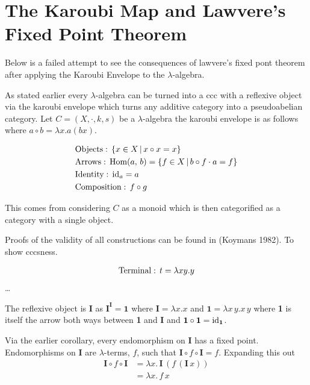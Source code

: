 \documentclass[ %
                author={Alessio Zakaria},
                supervisor={Dr. Nicolas Wu},
                degree={MEng},
                title={Automated Theorem Proving in Category Theory and the
                $\lambda$-calculus},
                subtitle={},
                type={Research},
                year={2019} ]{dissertation}
\begin{document}
\appendix

\chapter{The Karoubi Map and Lawvere's Fixed Point Theorem}
\label{appx:karoubi}

Below is a failed attempt to see the consequences of lawvere's fixed pont
theorem after applying the Karoubi Envelope to the $\lambda$-algebra.

As stated earlier every $\lambda$-algebra can be turned into a ccc with a
reflexive object via the karoubi envelope which turns any additive category into
a pseudoabelian category. Let $C = (X, \cdot , k, s)$ be a $\lambda$-algebra the
karoubi envelope is as follows where $a \circ b = \lambda x . a (b x)$.

\begin{align*}
    &\textnormal{Objects}: \, \{ x \in X \, | \, x \circ x = x \} \\
    &\textnormal{Arrows}: \, \textnormal{Hom}(a, \, b) =  \{ f \in X \, | \, b
        \circ f
    \cdot a = f\} \\
    &\textnormal{Identity}: \, \textnormal{id}_{a} = a \\
    &\textnormal{Composition}: \, f \circ g
\end{align*}

This comes from considering $C$ as a monoid which is then categorified as a
category with a single object.

Proofs of the validity of all constructions can be found in (Koymans 1982). To
show cccsness.

\begin{align*}
    &\textnormal{Terminal}: \, t = \lambda x y . y \\
\end{align*}
\ldots

The reflexive object is \textbf{I} as $\textbf{I}^\textbf{I} = \textbf{1}$ where
$\textbf{I} = \lambda x.x$ and $\textbf{1} = \lambda x \, y . x \, y$ where
\textbf{1} is itself the arrow both ways between \textbf{1} and \textbf{I} and
$\textbf{1} \circ \textbf{1} = \textnormal{id}_{\textbf{1}}$.

Via the earlier corollary, every endomorphism on \textbf{I} has a fixed point.
Endomorphisms on \textbf{I} are $\lambda$-terms, $f$, such that $\textbf{I}
\circ f \circ \textbf{I} = f$. Expanding this out
\begin{align*}
    \textbf{I} \circ f \circ \textbf{I} &= \lambda x . \, \textbf{I} \, (f \, (\textbf{I}
    \, x)) \\
    &= \lambda x . \, f \, x
\end{align*}
\end{document}
